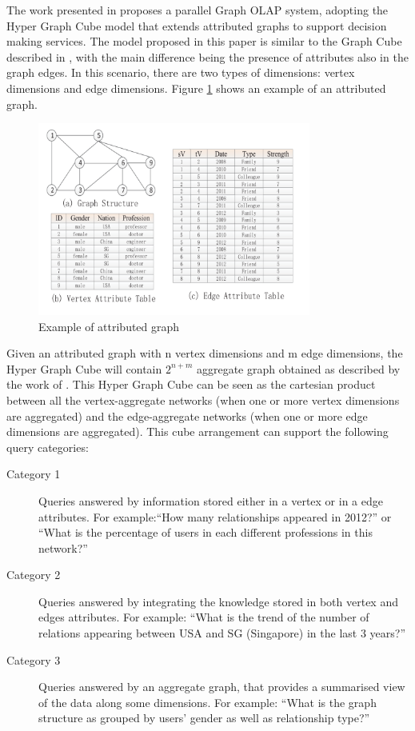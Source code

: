The work presented in \cite{Wang2014} proposes a parallel Graph OLAP system, adopting the Hyper Graph Cube model that extends attributed graphs to support decision making services. The model proposed in this paper is similar to the Graph Cube described in \cite{Zhao2011}, with the main difference being the presence of attributes also in the graph edges. In this scenario, there are two types of dimensions: vertex dimensions and edge dimensions. Figure \ref{fig:figure20} shows an example of an attributed graph.

\begin{figure}[ht]
\centering
\includegraphics[width=0.8\textwidth]{../attributed_graph.png}
\caption{Example of attributed graph \cite{Wang2014}}
\label{fig:figure20}
\end{figure}

Given an attributed graph with n vertex dimensions and m edge dimensions, the Hyper Graph Cube will contain $2^{n+m}$ aggregate graph obtained as described by the work of \cite{Zhao2011}. This Hyper Graph Cube can be seen as the cartesian product between all the vertex-aggregate networks (when one or more vertex dimensions are aggregated) and the edge-aggregate networks (when one or more edge dimensions are aggregated). This cube arrangement can support the following query categories:

\begin{description}
\item[Category 1] Queries answered by information stored either in a vertex or  in a edge attributes. For example:``How many relationships appeared in 2012?'' or ``What is the percentage of users in each different professions in this network?''
\item[Category 2] Queries answered by integrating the knowledge stored in both vertex and edges attributes. For example: ``What is the trend of the number of relations appearing between USA and SG (Singapore) in the last 3 years?''
\item[Category 3] Queries answered by an aggregate graph, that provides a summarised view of the data along some dimensions. For example: ``What is the graph structure as grouped by users' gender as well as relationship type?''
\end{description}

